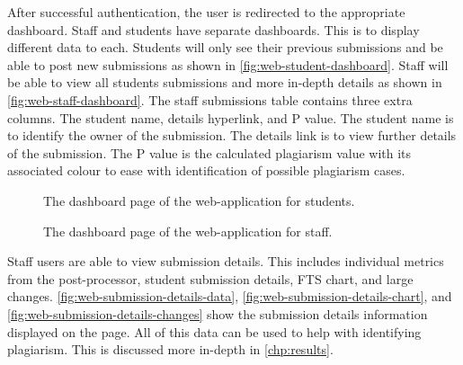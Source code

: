 After successful authentication, the user is redirected to the appropriate dashboard. Staff and students have separate dashboards. This is to display different data to each. Students will only see their previous submissions and be able to post new submissions as shown in \autoref{fig:web-student-dashboard}. Staff will be able to view all students submissions and more in-depth details as shown in \autoref{fig:web-staff-dashboard}. The staff submissions table contains three extra columns. The student name, details hyperlink, and P value. The student name is to identify the owner of the submission. The details link is to view further details of the submission. The P value is the calculated plagiarism value with its associated colour to ease with identification of possible plagiarism cases.

\begin{figure}[H]
  \centering
  \caption[Web Student Dashboard Page]{The dashboard page of the web-application for students.}
  \label{fig:web-student-dashboard}
\end{figure}

\begin{figure}[H]
  \centering
  \caption[Web Staff Dashboard Page]{The dashboard page of the web-application for staff.}
  \label{fig:web-staff-dashboard}
\end{figure}

Staff users are able to view submission details. This includes individual metrics from the post-processor, student submission details, FTS chart, and large changes. \autoref{fig:web-submission-details-data}, \autoref{fig:web-submission-details-chart}, and \autoref{fig:web-submission-details-changes} show the submission details information displayed on the page. All of this data can be used to help with identifying plagiarism. This is discussed more in-depth in \autoref{chp:results}.

